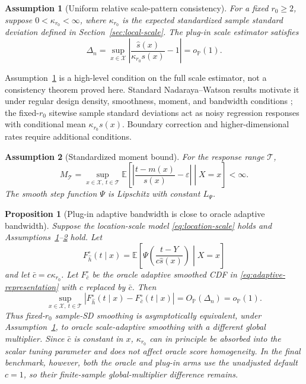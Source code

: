 \documentclass[11pt]{article}
\newtheorem{assumption}{Assumption}
\newtheorem{proposition}{Proposition}
\newcommand{\Xcal}{\mathcal X}
\newcommand{\Tcal}{\mathcal T}
\newcommand{\E}{\mathbb E}
\newcommand{\abs}[1]{\left\lvert #1 \right\rvert}
\newcommand{\op}{o_{\mathbb P}}
\newcommand{\Op}{O_{\mathbb P}}
\begin{document}
\begin{assumption}[Uniform relative scale-pattern consistency]
\label{ass:scale}
For a fixed \(r_0\ge 2\), suppose \(0<\kappa_{r_0}<\infty\), where \(\kappa_{r_0}\) is the expected standardized sample standard deviation defined in Section~\ref{sec:local-scale}. The plug-in scale estimator satisfies
\[
  \Delta_n
  =
  \sup_{x\in\Xcal}
  \abs{\frac{\widehat s(x)}{\kappa_{r_0}s(x)}-1}
  =\op(1).
\]
\end{assumption}

Assumption~\ref{ass:scale} is a high-level condition on the full scale estimator, not a consistency theorem proved here. Standard Nadaraya--Watson results motivate it under regular design density, smoothness, moment, and bandwidth conditions \cite{hardle1990}; the fixed-\(r_0\) sitewise sample standard deviations act as noisy regression responses with conditional mean \(\kappa_{r_0}s(x)\). Boundary correction and higher-dimensional rates require additional conditions.

\begin{assumption}[Standardized moment bound]
\label{ass:std-moment}
For the response range \(\Tcal\),
\[
  M_{\Tcal}
  =
  \sup_{x\in\Xcal,\ t\in\Tcal}
  \E\left[
  \abs{\frac{t-m(x)}{s(x)}-\varepsilon}
  \middle|X=x
  \right]
  <\infty.
\]
The smooth step function \(\Psi\) is Lipschitz with constant \(L_\Psi\).
\end{assumption}

\begin{proposition}[Plug-in adaptive bandwidth is close to oracle adaptive bandwidth]
\label{prop:plugin-oracle}
Suppose the location-scale model \eqref{eq:location-scale} holds and Assumptions~\ref{ass:scale}--\ref{ass:std-moment} hold. Let
\[
  F_{\widehat h}^{\circ}(t\mid x)
  =
  \E\left[
  \Psi\!\left(\frac{t-Y}{c\widehat s(x)}\right)
  \middle|X=x
  \right]
\]
and let \(\bar c=c\kappa_{r_0}\). Let \(F_{\bar c}^\circ\) be the oracle adaptive smoothed CDF in \eqref{eq:adaptive-representation} with \(c\) replaced by \(\bar c\). Then
\[
  \sup_{x\in\Xcal,\ t\in\Tcal}
  \abs{F_{\widehat h}^{\circ}(t\mid x)-F_{\bar c}^\circ(t\mid x)}
  =
  \Op(\Delta_n)
  =
  \op(1).
\]
Thus fixed-\(r_0\) sample-SD smoothing is asymptotically equivalent, under
Assumption~\ref{ass:scale}, to oracle scale-adaptive smoothing with a
different global multiplier. Since \(\bar c\) is constant in \(x\),
\(\kappa_{r_0}\) can in principle be absorbed into the scalar tuning
parameter and does not affect oracle score homogeneity. In the final
benchmark, however, both the oracle and plug-in arms use the unadjusted
default \(c=1\), so their finite-sample global-multiplier difference remains.
\end{proposition}
\end{document}
